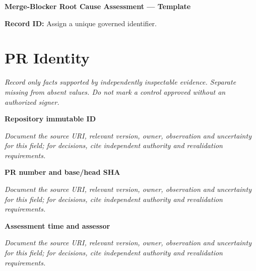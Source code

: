 \documentclass[11pt,letterpaper]{article}
\begin{document}
\begin{center}{\LARGE\bfseries Merge-Blocker Root Cause Assessment --- Template}\par
\vspace{4pt}{\small Guided authoring instrument (not a completed assessment)}\par
\end{center}
\noindent\textbf{Record ID:} Assign a unique governed identifier.\par
\section{PR Identity}
\noindent\emph{Record only facts supported by independently inspectable evidence. Separate missing from absent values. Do not mark a control approved without an authorized signer.}\par
\noindent\textbf{Repository immutable ID}\par
\noindent\emph{Document the source URI, relevant version, owner, observation and uncertainty for this field; for decisions, cite independent authority and revalidation requirements.}\par\medskip
\noindent\textbf{PR number and base/head SHA}\par
\noindent\emph{Document the source URI, relevant version, owner, observation and uncertainty for this field; for decisions, cite independent authority and revalidation requirements.}\par\medskip
\noindent\textbf{Assessment time and assessor}\par
\noindent\emph{Document the source URI, relevant version, owner, observation and uncertainty for this field; for decisions, cite independent authority and revalidation requirements.}\par\medskip
\end{document}
